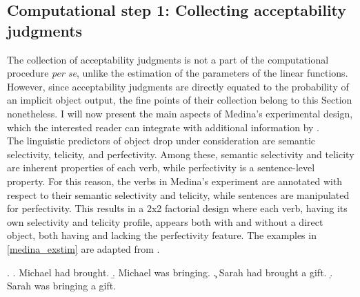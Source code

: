 \subsection{Computational step 1: Collecting acceptability judgments} The collection of acceptability judgments is not a part of the computational procedure \textit{per se}, unlike the estimation of the parameters of the linear functions. However, since acceptability judgments are directly equated to the probability of an implicit object output, the fine points of their collection belong to this Section nonetheless. I will now present the main aspects of Medina's experimental design, which the interested reader can integrate with additional information by \textcite[110-134]{Medina2007}.\\
The linguistic predictors of object drop under consideration are semantic selectivity, telicity, and perfectivity. Among these, semantic selectivity and telicity are inherent properties of each verb, while perfectivity is a sentence-level property. For this reason, the verbs in Medina's experiment are annotated with respect to their semantic selectivity and telicity, while sentences are manipulated for perfectivity. This results in a 2x2 factorial design where each verb, having its own selectivity and telicity profile, appears both with and without a direct object, both having and lacking the perfectivity feature. The examples in \ref{medina_exstim} are adapted from \textcite[113]{Medina2007}.

\ex. \label{medina_exstim} \a. \label{medina_exstim1} Michael had brought.
\b. \label{medina_exstim2}  Michael was bringing.
\c. \label{medina_exstim3}  Sarah had brought a gift.
\d. \label{medina_exstim4}  Sarah was bringing a gift.

